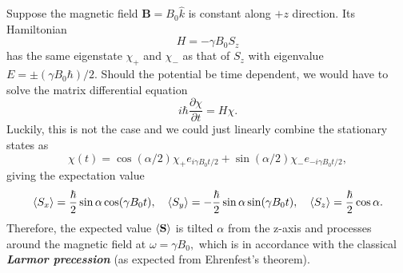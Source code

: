 \documentclass{article}
\theoremstyle{nonumberplain}
\begin{document}
Suppose the magnetic field $\mathbf{B}  = B_0 \hat{k}$ is constant along $+z$ direction. Its Hamiltonian 
\[
    H = -\gamma B_0 S_z
\]
has the same eigenstate $\chi_+$ and $\chi_-$ as that of $S_z$ with eigenvalue $E = \pm (\gamma  B_0 \hbar ) /2$. Should the potential be time dependent, we would have to solve the matrix differential equation 
\[
    i \hbar \frac{\partial \chi }{\partial t} = H \chi. 
\]
Luckily, this is not the case and we could just linearly combine the stationary states as 
\[
    \chi(t) = \cos (\alpha /2) \chi _+ e_{i \gamma  B_0 t /2} + \sin (\alpha /2) \chi _- e_{-i \gamma  B_0 t /2},
\]
giving the expectation value 
\[
    \expval{S_x} = \frac{\hbar}{2} \sin \alpha \cos (\gamma B_0 t), \quad 
    \expval{S_y} = - \frac{\hbar}{2} \sin \alpha \sin (\gamma B_0 t), \quad 
    \expval{S_z} = \frac{\hbar}{2} \cos \alpha . 
\]
Therefore, the expected value $\expval{\mathbf{S}}$ is tilted $\alpha$ from the z-axis and processes around the magnetic field at $\omega  = \gamma  B_0,$ which is in accordance with the classical \textit{\textbf{Larmor precession}} (as expected from Ehrenfest's theorem). 
\end{document}
